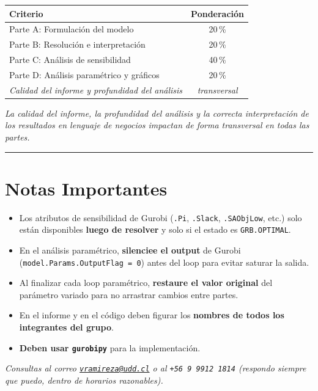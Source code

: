 \documentclass[12pt,a4paper]{article}
\begin{document}
\begin{center}
\renewcommand{\arraystretch}{1.2}
\begin{tabular}{lc}
\toprule
\textbf{Criterio} & \textbf{Ponderación} \\
\midrule
Parte A: Formulación del modelo                      & 20\,\% \\
Parte B: Resolución e interpretación                 & 20\,\% \\
Parte C: Análisis de sensibilidad                    & 40\,\% \\
Parte D: Análisis paramétrico y gráficos             & 20\,\% \\
\midrule
\textit{Calidad del informe y profundidad del análisis} &
\textit{transversal} \\
\bottomrule
\end{tabular}
\end{center}

\vspace{0.3em}
\noindent\textit{La calidad del informe, la profundidad del análisis y la
correcta interpretación de los resultados en lenguaje de negocios impactan
de forma transversal en todas las partes.}

\noindent\rule{\linewidth}{0.4pt}

\section*{Notas Importantes}

\begin{itemize}[topsep=2pt]
    \item Los atributos de sensibilidad de Gurobi (\texttt{.Pi},
          \texttt{.Slack}, \texttt{.SAObjLow}, etc.) solo están disponibles
          \textbf{luego de resolver} y solo si el estado es
          \texttt{GRB.OPTIMAL}.
    \item En el análisis paramétrico, \textbf{silenciee el output} de
          Gurobi (\texttt{model.Params.OutputFlag = 0}) antes del loop
          para evitar saturar la salida.
    \item Al finalizar cada loop paramétrico, \textbf{restaure el valor
          original} del parámetro variado para no arrastrar cambios entre
          partes.
    \item En el informe y en el código deben figurar los \textbf{nombres
          de todos los integrantes del grupo}.
    \item \textbf{Deben usar \texttt{gurobipy}} para la implementación.
\end{itemize}

\vspace{1em}
\begin{center}
\textit{Consultas al correo
\href{mailto:vramireza@udd.cl}{\texttt{vramireza@udd.cl}} o al
\texttt{+56\,9\,9912\,1814}
(respondo siempre que puedo, dentro de horarios razonables).}
\end{center}

\end{document}

